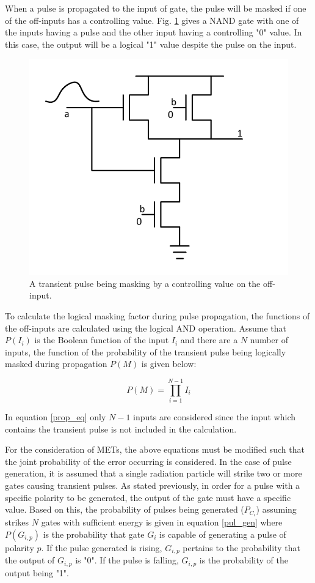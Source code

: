 When a pulse is propagated to the input of gate, the pulse will be masked if one of the off-inputs has a controlling value. Fig. \ref{Prop_NAND} gives a NAND gate with one of the inputs having a pulse and the other input having a controlling "0" value. In this case, the output will be a logical "1" value despite the pulse on the input.

\begin{figure}[!htbp]
	\centering
	\includegraphics[width=0.55\linewidth]{Figures/Prop_func}
	\caption{A transient pulse being masking by a controlling value on the off-input.}
	\label{Prop_NAND}
\end{figure}

To calculate the logical masking factor during pulse propagation, the functions of the off-inputs are calculated using the logical AND operation. Assume that $P(I_i)$ is the Boolean function of the input $I_i$ and there are a $N$ number of inputs, the function of the probability of the transient pulse being logically masked during propagation $P(M)$ is given below:

\begin{equation} \label{prop_eq}
P(M) = \prod_{i=1}^{N-1} I_i
\end{equation}

In equation \ref{prop_eq} only $N-1$ inputs are considered since the input which contains the transient pulse is not included in the calculation. 

For the consideration of METs, the above equations must be modified such that the joint probability of the error occurring is considered. In the case of pulse generation, it is assumed that a single radiation particle will strike two or more gates causing transient pulses. As stated previously, in order for a pulse with a specific polarity to be generated, the output of the gate must have a specific value. Based on this, the probability of pulses being generated ($P_{C_i}$) assuming strikes $N$ gates with sufficient energy is given in equation \ref{pul_gen} where $P(G_{i,p})$ is the probability that gate $G_i$ is capable of generating a pulse of polarity $p$. If the pulse generated is rising, $G_{i,p}$ pertains to the probability that the output of $G_{i,p}$ is "0". If the pulse is falling, $G_{i,p}$ is the probability of the output being "1".

